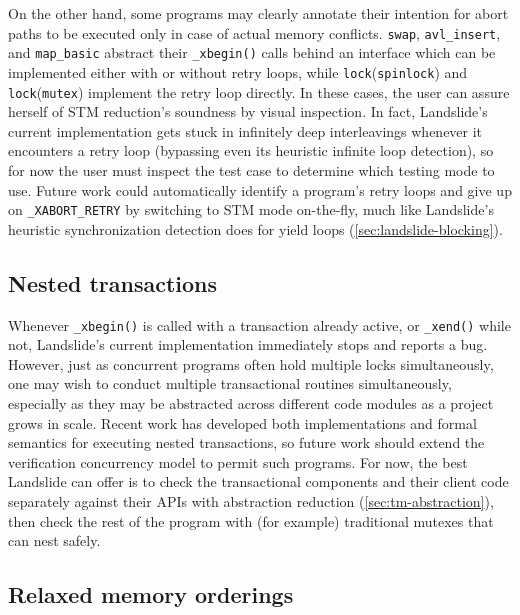 On the other hand, some programs may clearly annotate their intention
for abort paths to be executed only in case of actual memory conflicts.
{\tt swap}, {\tt avl\_insert}, and {\tt map\_basic} abstract their {\tt \_xbegin()} calls
behind an interface which can be implemented either with or without retry loops,
while {\tt lock}({\tt spinlock}) and {\tt lock}({\tt mutex}) implement the retry loop directly.
In these cases, the user can assure herself of STM reduction's soundness by visual inspection.
In fact, Landslide's current implementation gets stuck in infinitely deep interleavings
whenever it encounters a retry loop
(bypassing even its heuristic infinite loop detection),
so for now the user must inspect the test case to determine which testing mode to use.
Future work could automatically identify a program's retry loops
and give up on {\tt \_XABORT\_RETRY} by switching to STM mode on-the-fly,
much like Landslide's heuristic synchronization detection does for yield loops (\cref{sec:landslide-blocking}).

\subsection{Nested transactions}
\label{sec:tm-warpzone-nested}

Whenever {\tt \_xbegin()} is called with a transaction already active, or {\tt \_xend()} while not,
Landslide's current implementation immediately stops and reports a bug.
However, just as concurrent programs often hold multiple locks simultaneously,
one may wish to conduct multiple transactional routines simultaneously,
especially as they may be abstracted across different code modules as a project grows in scale.
Recent work \cite{hybrid-htm-stm,relaxed-transactions-popl} has developed
both implementations and formal semantics for executing nested transactions,
so future work should extend the verification concurrency model to permit such programs.
For now, the best Landslide can offer is to check the transactional components and their client code
separately against their APIs
with abstraction reduction (\cref{sec:tm-abstraction}),
then check the rest of the program with (for example) traditional mutexes that can nest safely.

\subsection{Relaxed memory orderings}
\label{sec:tm-warpzone-relaxed}

